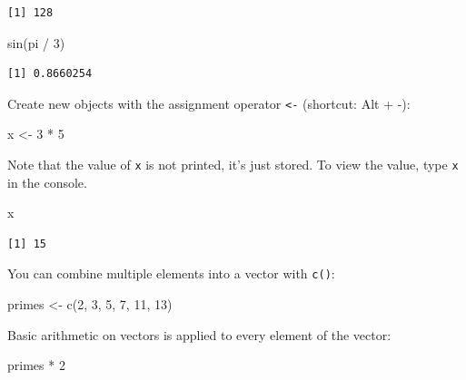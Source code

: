 \documentclass[
  letterpaper,
  DIV=11,
  numbers=noendperiod]{scrreprt}
\newenvironment{Shaded}{\begin{snugshade}}{\end{snugshade}}
\newcommand{\DecValTok}[1]{\textcolor[rgb]{0.68,0.00,0.00}{#1}}
\newcommand{\FunctionTok}[1]{\textcolor[rgb]{0.28,0.35,0.67}{#1}}
\newcommand{\NormalTok}[1]{\textcolor[rgb]{0.00,0.23,0.31}{#1}}
\newcommand{\OtherTok}[1]{\textcolor[rgb]{0.00,0.23,0.31}{#1}}
\newcommand{\SpecialCharTok}[1]{\textcolor[rgb]{0.37,0.37,0.37}{#1}}
\begin{document}
\begin{verbatim}
[1] 128
\end{verbatim}

\begin{Shaded}
\begin{Highlighting}[]
\FunctionTok{sin}\NormalTok{(pi }\SpecialCharTok{/} \DecValTok{3}\NormalTok{)}
\end{Highlighting}
\end{Shaded}

\begin{verbatim}
[1] 0.8660254
\end{verbatim}

Create new objects with the assignment operator \texttt{\textless{}-}
(shortcut: Alt + -):

\begin{Shaded}
\begin{Highlighting}[]
\NormalTok{x }\OtherTok{\textless{}{-}} \DecValTok{3} \SpecialCharTok{*} \DecValTok{5}
\end{Highlighting}
\end{Shaded}

Note that the value of \texttt{x} is not printed, it's just stored. To
view the value, type \texttt{x} in the console.

\begin{Shaded}
\begin{Highlighting}[]
\NormalTok{x}
\end{Highlighting}
\end{Shaded}

\begin{verbatim}
[1] 15
\end{verbatim}

You can combine multiple elements into a vector with \texttt{c()}:

\begin{Shaded}
\begin{Highlighting}[]
\NormalTok{primes }\OtherTok{\textless{}{-}} \FunctionTok{c}\NormalTok{(}\DecValTok{2}\NormalTok{, }\DecValTok{3}\NormalTok{, }\DecValTok{5}\NormalTok{, }\DecValTok{7}\NormalTok{, }\DecValTok{11}\NormalTok{, }\DecValTok{13}\NormalTok{)}
\end{Highlighting}
\end{Shaded}

Basic arithmetic on vectors is applied to every element of the vector:

\begin{Shaded}
\begin{Highlighting}[]
\NormalTok{primes }\SpecialCharTok{*} \DecValTok{2}
\end{Highlighting}
\end{Shaded}
\end{document}
